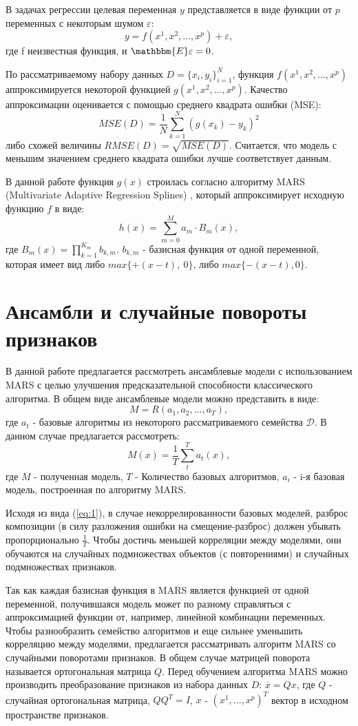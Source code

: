 \documentclass{article}
\begin{document}
В задачах регрессии целевая переменная $y$ представляется в виде функции от $p$ переменных с некоторым шумом $\varepsilon$: $$y=f(x^1, x^2, ..., x^p) + \varepsilon,$$ где f неизвестная функция, и $\mathbbm{E}\varepsilon = 0$.

По рассматриваемому набору данных $D = \{x_i, y_i\}_{i=1}^{N}$, функция $f(x^1, x^2, ..., x^p)$ аппроксимируется некоторой функцией $g(x^1, x^2, ..., x^p)$. Качество аппроксимации оценивается с помощью среднего квадрата ошибки (MSE):
$$MSE(D) = \frac{1}{N}\sum_{k=1}^{N} (g(x_k) - y_k)^2$$
либо схожей величины $RMSE(D) = \sqrt{MSE(D)}$.
Считается, что модель с меньшим значением среднего квадрата ошибки лучше соответствует
данным.

В данной работе функция $g(x)$ строилась согласно алгоритму MARS (Multivariate Adaptive Regression Splines) \cite{friedman1991multivariate}, который аппроксимирует исходную функцию $f$ в виде:
$$h(x) = \sum_{m=0}^{M} a_m \cdot B_m(x),$$ где $B_m(x) = \prod_{k=1}^{K_m} b_{k,m}.$
$b_{k,m}$ - базисная функция от одной переменной, которая имеет вид либо $max\{+(x-t),~0\}$, либо $max\{-(x-t), 0\}.$

\section{Ансамбли и случайные повороты признаков}
В данной работе предлагается рассмотреть ансамблевые модели с использованием MARS с целью улучшения предсказательной способности классического алгоритма. В общем виде ансамблевые модели можно представить в виде:
$$M = R(a_1, a_2, ..., a_T),$$ где $a_t$ - базовые алгоритмы из некоторого рассматриваемого семейства $\mathcal{D}$. В данном случае предлагается рассмотреть:
\begin{equation} \label{eq:1}
    M(x) = \frac{1}{T}\sum_{t}^{T}a_t(x),
\end{equation}
где $M$ - полученная модель, $T$ - Количество базовых алгоритмов, $a_i$ - i-я базовая модель, построенная по алгоритму MARS.

Исходя из вида (\ref{eq:1}), в случае некоррелированности базовых моделей, разброс композиции (в силу разложения ошибки на смещение-разброс) должен убывать пропорционально $\frac{1}{T}$. Чтобы достичь меньшей корреляции между моделями, они обучаются на случайных подмножествах объектов (с повторениями) и случайных подмножествах признаков. 

Так как каждая базисная функция в MARS является функцией от одной переменной, получившаяся модель может по разному справляться с аппроксимацией функции от, например, линейной комбинации переменных. Чтобы разнообразить семейство алгоритмов и еще сильнее уменьшить корреляцию между моделями, предлагается рассматривать алгоритм MARS со случайными поворотами признаков. В общем случае матрицей поворота называется ортогональная матрица $Q$. Перед обучением алгоритма MARS можно производить преобразование признаков из набора данных $D$:
$\overline{x} = Qx$, где $Q$ - случайная ортогональная матрица, $QQ^T = I$, $x$ - $(x^1, ..., x^p)^T$ вектор в исходном пространстве признаков.
\end{document}
